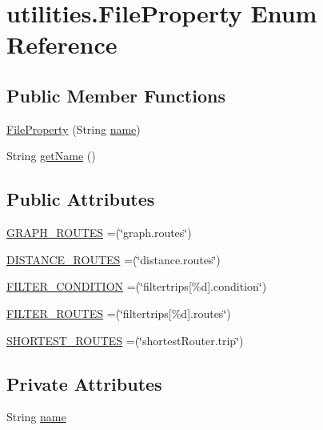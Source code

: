 \hypertarget{enumutilities_1_1_file_property}{}\section{utilities.\+File\+Property Enum Reference}
\label{enumutilities_1_1_file_property}
\subsection*{Public Member Functions}
\begin{DoxyCompactItemize}
\item 
\hyperlink{enumutilities_1_1_file_property_ae5d3cd75fb3b377b2e9570490d54f8af}{File\+Property} (String \hyperlink{enumutilities_1_1_file_property_a85714af226bffac084d6264b5bac15d7}{name})
\item 
String \hyperlink{enumutilities_1_1_file_property_ab7c90f768108531dd4468878da2f452d}{get\+Name} ()
\end{DoxyCompactItemize}
\subsection*{Public Attributes}
\begin{DoxyCompactItemize}
\item 
\hyperlink{enumutilities_1_1_file_property_a057ee24e5d0a6a4ca1c9dab2fa0103f1}{G\+R\+A\+P\+H\+\_\+\+R\+O\+U\+T\+ES} =(\char`\"{}graph.\+routes\char`\"{})
\item 
\hyperlink{enumutilities_1_1_file_property_a4d85ea554068d0cfe0de81567126cda1}{D\+I\+S\+T\+A\+N\+C\+E\+\_\+\+R\+O\+U\+T\+ES} =(\char`\"{}distance.\+routes\char`\"{})
\item 
\hyperlink{enumutilities_1_1_file_property_afc45daab73cc6bec29b8c3cb399efa83}{F\+I\+L\+T\+E\+R\+\_\+\+C\+O\+N\+D\+I\+T\+I\+ON} =(\char`\"{}filtertrips\mbox{[}\%d\mbox{]}.condition\char`\"{})
\item 
\hyperlink{enumutilities_1_1_file_property_a86032f5784fe389cae88ea4480bdf0f2}{F\+I\+L\+T\+E\+R\+\_\+\+R\+O\+U\+T\+ES} =(\char`\"{}filtertrips\mbox{[}\%d\mbox{]}.routes\char`\"{})
\item 
\hyperlink{enumutilities_1_1_file_property_ae43a0f6ce3fd6c1cb9ec0e8d42ba2cf0}{S\+H\+O\+R\+T\+E\+S\+T\+\_\+\+R\+O\+U\+T\+ES} =(\char`\"{}shortest\+Router.\+trip\char`\"{})
\end{DoxyCompactItemize}
\subsection*{Private Attributes}
\begin{DoxyCompactItemize}
\item 
String \hyperlink{enumutilities_1_1_file_property_a85714af226bffac084d6264b5bac15d7}{name}
\end{DoxyCompactItemize}


